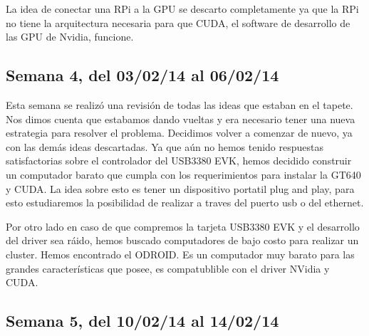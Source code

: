 \documentclass[11pt,oneside,titlepage]{article}
\begin{document}
La idea de conectar una RPi a la GPU se descarto completamente ya que la RPi no 
tiene la arquitectura necesaria para que CUDA, el software de desarrollo de las GPU de Nvidia, funcione.

\subsection*{Semana 4, del 03/02/14 al 06/02/14}

Esta semana se realizó una revisión de todas las ideas que estaban en el
tapete. Nos dimos cuenta que estabamos dando vueltas y era necesario tener una
nueva estrategia para resolver el problema. Decidimos volver a comenzar de
nuevo, ya con las demás ideas descartadas. Ya que aún no hemos tenido
respuestas satisfactorias sobre el controlador del USB3380 EVK, hemos decidido
construir un computador barato que cumpla con los requerimientos para instalar
la GT640 y CUDA. La idea sobre esto es tener un dispositivo portatil plug and
play, para esto estudiaremos la posibilidad de realizar a traves del puerto usb
o del ethernet. 

Por otro lado en caso de que compremos la tarjeta USB3380 EVK y el desarrollo
del driver sea ráido, hemos buscado computadores de bajo costo para realizar un
cluster. Hemos encontrado el ODROID. Es un computador muy barato para las
grandes características que posee, es compatublible con el driver NVidia y
CUDA.

\subsection*{Semana 5, del 10/02/14 al 14/02/14}
\begin{comment}
lunes
- Ademas se realizó un estudio sobre como conectar el comptuador de una forma
plug and play, las opciones son utilizar el puerto Ethernet o, mejor aún,
realizar la conexión a trav\'es USB.

martes 
- Reunion con el profesor para ver el estado del proyecto. 3 ideas
  nuevas aparecieron.

miercoles 
- Contacto con un desarrollador de USB3380 para solicitar ayuda en el
  campo. 
- Estudio de RNDIS para conectar usb a usb, existe la posibilidad.

jueves 
- Estudio del funcionamiento de usb. Aprendi que podemos utilizar el
  computador como gadget y realizar la configuración recompilando el kernel y
  agregando los drivers.Mas detalles leer Linux Gadget Drivers
- Aún falta el cable. 
- Compilación del kernel para agregar los módulos. Estamos a la espera
  del cable USB macho macho.

viernes 
- Update del proyecto al profesor Claudio torres. 
 - compramos cable USB 3.0, estamos a la espera del envío.
\end{comment}
\end{document}
